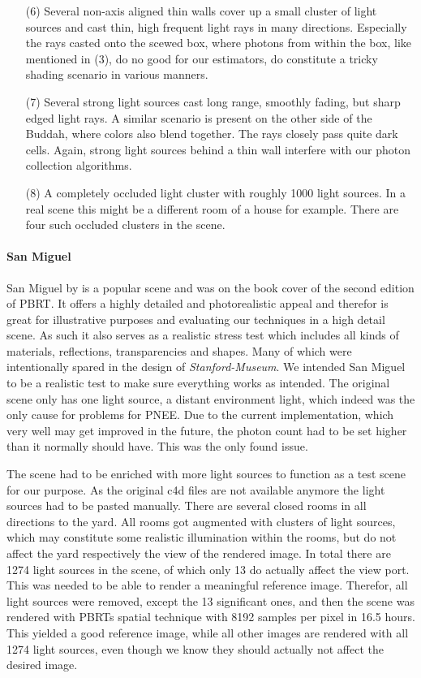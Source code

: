 \begin{itemize}
    \item[(6)] Several non-axis aligned thin walls cover up a small cluster of light sources and cast thin, high frequent light rays in many directions. Especially the rays casted onto the scewed box, where photons from within the box, like mentioned in (3), do no good for our estimators, do constitute a tricky shading scenario in various manners.
    \item[(7)] Several strong light sources cast long range, smoothly fading, but sharp edged light rays. A similar scenario is present on the other side of the Buddah, where colors also blend together. The rays closely pass quite dark cells. Again, strong light sources behind a thin wall interfere with our photon collection algorithms.
    \item[(8)] A completely occluded light cluster with roughly 1000 light sources. In a real scene this might be a different room of a house for example. There are four such occluded clusters in the scene.
\label{li:stanfordmuseum}
\end{itemize}
\paragraph{San Miguel}
San Miguel by \textcite{Sanmiguel} is a popular scene and was on the book cover of the second edition of PBRT. It offers a highly detailed and photorealistic appeal and therefor is great for illustrative purposes and evaluating our techniques in a high detail scene. As such it also serves as a realistic stress test which includes all kinds of materials, reflections, transparencies and shapes. Many of which were intentionally spared in the design of \textit{Stanford-Museum}. We intended San Miguel to be a realistic test to make sure everything works as intended. The original scene only has one light source, a distant environment light, which indeed was the only cause for problems for PNEE. Due to the current implementation, which very well may get improved in the future, the photon count had to be set higher than it normally should have. This was the only found issue.

The scene had to be enriched with more light sources to function as a test scene for our purpose. As the original c4d files are not available anymore the light sources had to be pasted manually. There are several closed rooms in all directions to the yard. All rooms got augmented with clusters of light sources, which may constitute some realistic illumination within the rooms, but do not affect the yard respectively the view of the rendered image. In total there are 1274 light sources in the scene, of which only 13 do actually affect the view port. This was needed to be able to render a meaningful reference image. Therefor, all light sources were removed, except the 13 significant ones, and then the scene was rendered with PBRTs spatial technique with 8192 samples per pixel in 16.5 hours. This yielded a good reference image, while all other images are rendered with all 1274 light sources, even though we know they should actually not affect the desired image.

